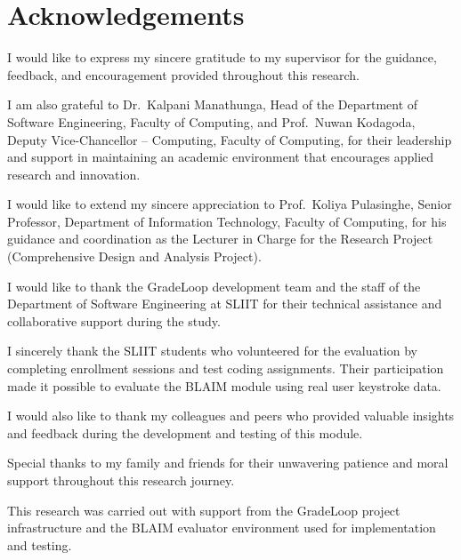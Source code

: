 \chapter*{Acknowledgements}
\thispagestyle{plain}

I would like to express my sincere gratitude to my supervisor for the guidance, feedback, and encouragement provided throughout this research.

I am also grateful to Dr.~Kalpani Manathunga, Head of the Department of Software Engineering, Faculty of Computing, and Prof.~Nuwan Kodagoda, Deputy Vice-Chancellor -- Computing, Faculty of Computing, for their leadership and support in maintaining an academic environment that encourages applied research and innovation.

\medskip

I would like to extend my sincere appreciation to Prof.~Koliya Pulasinghe, Senior Professor, Department of Information Technology, Faculty of Computing, for his guidance and coordination as the Lecturer in Charge for the Research Project (Comprehensive Design and Analysis Project).

\medskip

I would like to thank the GradeLoop development team and the staff of the Department of Software Engineering at SLIIT for their technical assistance and collaborative support during the study.

\medskip

I sincerely thank the SLIIT students who volunteered for the evaluation by completing enrollment sessions and test coding assignments. Their participation made it possible to evaluate the BLAIM module using real user keystroke data.

\medskip

I would also like to thank my colleagues and peers who provided valuable insights and feedback during the development and testing of this module.

\medskip

Special thanks to my family and friends for their unwavering patience and moral support throughout this research journey.

\medskip

This research was carried out with support from the GradeLoop project infrastructure and the BLAIM evaluator environment used for implementation and testing.

\clearpage
